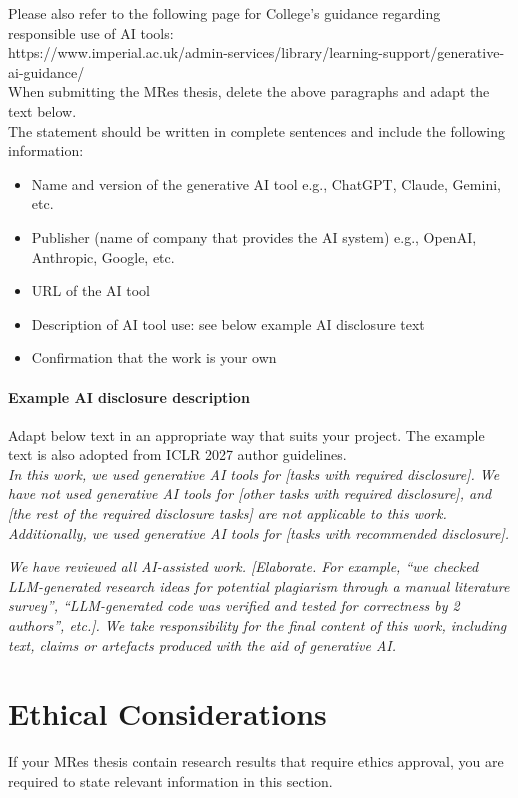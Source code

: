 \documentclass[12pt,twoside]{report}
\begin{document}
Please also refer to the following page for College's guidance regarding responsible use of AI tools: \\
https://www.imperial.ac.uk/admin-services/library/learning-support/generative-ai-guidance/ \\

When submitting the MRes thesis, delete the above paragraphs and adapt the text below. \\

The statement should be written in complete sentences and include the following information: 

\begin{itemize}
\item Name and version of the generative AI tool e.g., ChatGPT, Claude, Gemini, etc.
\item Publisher (name of company that provides the AI system) e.g., OpenAI, Anthropic, Google, etc.
\item URL of the AI tool 
\item Description of AI tool use: see below example AI disclosure text
\item Confirmation that the work is your own 
\end{itemize}

\paragraph{Example AI disclosure description} 

Adapt below text in an appropriate way that suits your project. The example text is also adopted from ICLR 2027 author guidelines. \\

\emph{In this work, we used generative AI tools for [tasks with required disclosure]. We have not used generative AI tools for [other tasks with required disclosure], and [the rest of the required disclosure tasks] are not applicable to this work. Additionally, we used generative AI tools for [tasks with recommended disclosure]. }

\emph{We have reviewed all AI-assisted work. [Elaborate. For example, “we checked LLM-generated research ideas for potential plagiarism through a manual literature survey”, “LLM-generated code was verified and tested for correctness by 2 authors”, etc.]. We take responsibility for the final content of this work, including text, claims or artefacts produced with the aid of generative AI. }

\section{Ethical Considerations}
If your MRes thesis contain research results that require ethics approval, you are required to state relevant information in this section.
\end{document}
